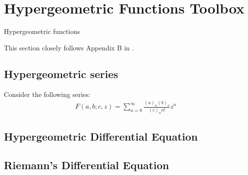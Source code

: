 \chapter{Hypergeometric Functions Toolbox} \label{hyper}
Hypergeometric functions 

This section closely follows Appendix B in \cite{Harlow:2011ny}.
\section{Hypergeometric series}
Consider the following series:
\begin{align}
 F(a,b;c,z) = \sum_{n=0}^\infty \frac{(a)_n(b)_n}{(c)_n n!} z^n
\end{align}
\section{Hypergeometric Differential Equation}

\section{Riemann's Differential Equation}